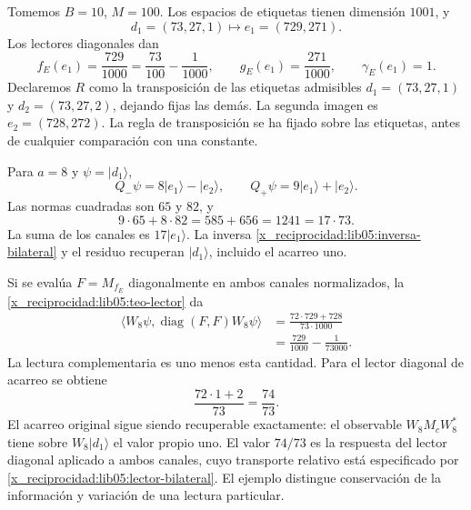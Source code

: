 Tomemos \(B=10\), \(M=100\). Los espacios de etiquetas tienen
dimensión \(1001\), y
\begin{equation}
 d_1=(73,27,1)\longmapsto e_1=(729,271).
 \label{x_reciprocidad:lib05:ejemplo-etiqueta}
\end{equation}
Los lectores diagonales dan
\begin{equation}
 f_E(e_1)=\frac{729}{1000}
 =\frac{73}{100}-\frac1{1000},\qquad
 g_E(e_1)=\frac{271}{1000},\qquad \gamma_E(e_1)=1.
 \label{x_reciprocidad:lib05:ejemplo-lectores}
\end{equation}
Declaremos \(R\) como la transposición de las etiquetas
admisibles \(d_1=(73,27,1)\) y \(d_2=(73,27,2)\), dejando
fijas las demás. La segunda imagen es \(e_2=(728,272)\).
La regla de transposición se ha fijado sobre las etiquetas, antes
de cualquier comparación con una constante.

Para \(a=8\) y \(\psi=|d_1\rangle\),
\begin{equation}
 Q_-\psi=8|e_1\rangle-|e_2\rangle,\qquad
 Q_+\psi=9|e_1\rangle+|e_2\rangle.
 \label{x_reciprocidad:lib05:ejemplo-canales}
\end{equation}
Las normas cuadradas son \(65\) y \(82\), y
\begin{equation}
 9\cdot65+8\cdot82=585+656=1241=17\cdot73.
 \label{x_reciprocidad:lib05:ejemplo-balance}
\end{equation}
La suma de los canales es \(17|e_1\rangle\). La inversa
\eqref{x_reciprocidad:lib05:inversa-bilateral} y el residuo recuperan
\(|d_1\rangle\), incluido el acarreo uno.

Si se evalúa \(F=M_{f_E}\) diagonalmente en ambos canales
normalizados, la \cref{x_reciprocidad:lib05:teo-lector} da
\begin{equation}
 \begin{split}
 \langle W_8\psi,\operatorname{diag}(F,F)W_8\psi\rangle
 &=\frac{72\cdot729+728}{73\cdot1000}\\
 &=\frac{729}{1000}-\frac1{73000}.
 \end{split}
 \label{x_reciprocidad:lib05:ejemplo-fraccion}
\end{equation}
La lectura complementaria es uno menos esta cantidad. Para el
lector diagonal de acarreo se obtiene
\begin{equation}
 \frac{72\cdot1+2}{73}=\frac{74}{73}.
 \label{x_reciprocidad:lib05:ejemplo-acarreo}
\end{equation}
El acarreo original sigue siendo recuperable exactamente: el
observable \(W_8M_cW_8^*\) tiene sobre \(W_8|d_1\rangle\)
el valor propio uno. El valor \(74/73\) es la respuesta del
lector diagonal aplicado a ambos canales, cuyo transporte relativo
está especificado por \eqref{x_reciprocidad:lib05:lector-bilateral}. El ejemplo
distingue conservación de la información y variación de una lectura
particular.

